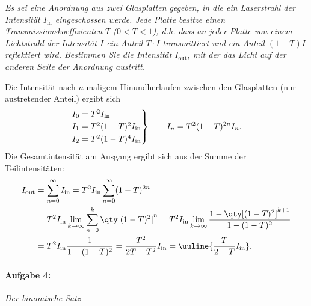 \emph{Es sei eine Anordnung aus zwei Glasplatten gegeben, in die ein Laserstrahl der Intensität $I_\text{in}$ eingeschossen werde. Jede Platte besitze einen Transmissionskoeffizienten $T$ ($0<T<1$), d.h. dass an jeder Platte von einem Lichtstrahl der Intensität $I$ ein Anteil $T\cdot I$ transmittiert und ein Anteil $(1-T)I$ reflektiert wird.
Bestimmen Sie die Intensität $I_\text{out}$, mit der das Licht auf der anderen Seite der Anordnung austritt.}\\
\begin{center}
    \vspace{-1cm}
\end{center}
Die Intensität nach $n$-maligem Hinundherlaufen zwischen den Glasplatten (nur austretender Anteil) ergibt sich 
\begin{align}
    \begin{rcases}
        I_0 = T^2 I_\text{in} \\
        I_1 = T^2 (1-T)^2 I_\text{in} \\
        I_2 = T^2 (1-T)^4 I_\text{in}
    \end{rcases} \qquad I_n = T^2 (1-T)^{2n} I_n. 
\end{align}
Die Gesamtintensität am Ausgang ergibt sich aus der Summe der Teilintensitäten: 
\begin{align}
    I_\text{out} &= \sum_{n=0}^\infty I_\text{in} = T^2 I_\text{in} \sum_{n=0}^\infty (1-T)^{2n} \notag \\
    &= T^2 I_\text{in} \lim_{k\to \infty} \sum_{n=0}^k \qty[(1-T)^2]^n = T^2 I_\text{in} \lim_{k\to \infty} \frac{1-\qty[(1-T)^2]^{k+1}}{1-(1-T)^2} \\
    &= T^2 I_\text{in} \frac{1}{1-(1-T)^2} =  \frac{T^2}{2T - T^2} I_\text{in}= \uuline{\frac{T}{2 - T} I_\text{in}}.
\end{align}

\paragraph{Aufgabe 4: } \emph{Der binomische Satz}

